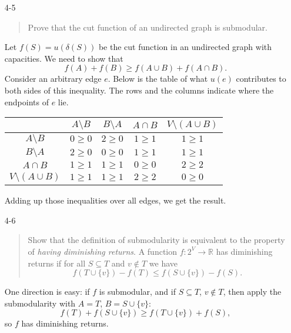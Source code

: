 \documentclass[12pt]{article}
\begin{document}
\begin{enumerate}
\begin{itemize}
\end{itemize}

\item[4-5]
\begin{quote}
Prove that the cut function of an undirected graph is submodular.
\end{quote}

Let $f(S) = u(\delta(S))$ be the cut function in an undirected graph with capacities. We need to show that
\[
f(A) + f(B) \geq f(A\cup B) + f(A\cap B).
\]
Consider an arbitrary edge $e$. Below is the table of what $u(e)$ contributes to both sides of this inequality. The rows and the columns indicate where the endpoints of $e$ lie.

\begin{center}
 \begin{tabular}{|c | c c c c|}
 \hline
 & $A\setminus B$ & $B\setminus A$ & $A \cap B$ & $V \setminus (A \cup B)$  \\ %
 \hline
 $A\setminus B$ &          $0 \ge 0$ & $2 \ge 0$ & $1 \ge 1$ & $1 \ge 1$ \\
 $B\setminus A$ &          $2 \ge 0$ & $0 \ge 0$ & $1 \ge 1$ & $1 \ge 1$ \\
 $A \cap B$&               $1 \ge 1$ & $1 \ge 1$ & $0 \ge 0$ & $2 \ge 2$ \\
 $V \setminus (A \cup B)$& $1 \ge 1$ & $1 \ge 1$ & $2 \ge 2$ & $0 \ge 0$ \\
 \hline
\end{tabular}
\end{center}

Adding up those inequalities over all edges, we get the result.

\item[4-6]
\begin{quote}
Show that the definition of submodularity is equivalent to the property of {\it having diminishing returns}. A function $f: 2^V \rightarrow \mathbb{R}$ has diminishing returns if for all $S\subseteq T$ and $v\notin T$ we have $$f(T\cup\{v\})-f(T) \leq f(S\cup\{v\})-f(S).$$
\end{quote}

One direction is easy: if $f$ is submodular, and if $S \subseteq T$, $v \notin T$, then apply the submodularity with $A = T$, $B = S \cup \{v\}$:
\[
f(T) + f(S \cup \{v\}) \geq f(T \cup \{v\}) + f(S),
\]
so $f$ has diminishing returns.


\end{enumerate}
\end{document}
